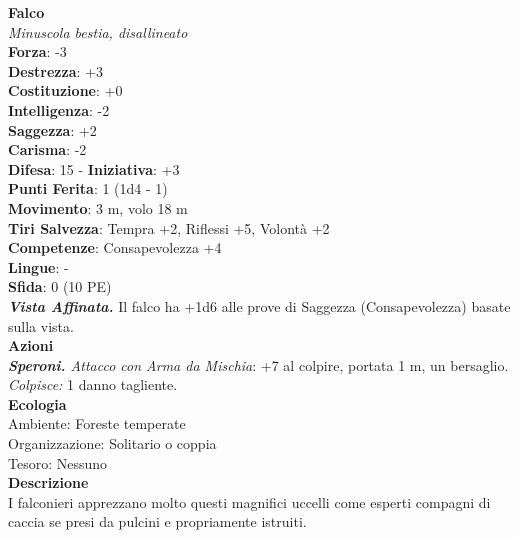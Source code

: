 \begin{multicols}{2}
\medskip\textbf{Falco}\\
\emph{Minuscola bestia, disallineato}\\
\textbf{Forza}: -3\\
\textbf{Destrezza}: +3\\
\textbf{Costituzione}: +0\\
\textbf{Intelligenza}: -2\\
\textbf{Saggezza}: +2\\
\textbf{Carisma}: -2\\
\textbf{Difesa}: 15 - \textbf{Iniziativa}: +3\\
\textbf{Punti Ferita}: 1 (1d4 - 1)\\
\textbf{Movimento}: 3 m, volo 18 m\\
\textbf{Tiri Salvezza}: Tempra +2, Riflessi +5, Volontà +2 \\
\textbf{Competenze}: Consapevolezza +4\\
\textbf{Lingue}: -\\
\textbf{Sfida}: 0 (10 PE)\smallskip\\
\emph{\textbf{Vista Affinata.}} Il falco ha +1d6 alle prove di Saggezza (Consapevolezza) basate sulla vista.\\
\smallskip\textbf{Azioni}\\
\emph{\textbf{Speroni.} Attacco con Arma da Mischia}: +7 al colpire, portata 1 m, un bersaglio.\\
\emph{Colpisce:} 1 danno tagliente. \\
\textbf{Ecologia}\\
Ambiente: Foreste temperate\\
Organizzazione: Solitario o coppia\\
Tesoro: Nessuno\\
\textbf{Descrizione}\\
I falconieri apprezzano molto questi magnifici uccelli come esperti compagni di caccia se presi da pulcini e propriamente istruiti. \\


\end{multicols}
